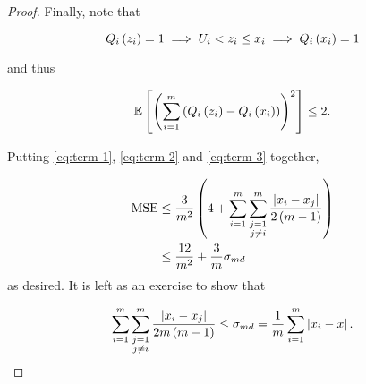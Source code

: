 \documentclass[twoside]{article}
\begin{document}
\begin{proof}
    Finally, note that

    \begin{equation}
        Q_i\left(z_i\right) = 1 \implies U_i < z_i \le x_i \implies Q_i\left(x_i\right) = 1
        \label{eq:ineq-qz-qx}
    \end{equation}

    and thus

    \begin{equation}
        \mathbb{E}\left[ \left(\sum_{i=1}^m\left(Q_i\left(z_i\right)-Q_i\left(x_i\right)\right)\right)^2 \right] \le 2.
        \label{eq:term-3}
    \end{equation}

    Putting \eqref{eq:term-1}, \eqref{eq:term-2} and \eqref{eq:term-3} together,

    \begin{align}
        \mathrm{MSE} &\le \frac{3}{m^2}\left(4 + \sum_{i=1}^m\sum_{\substack{j=1\\j\neq i}}^m\frac{\left\vert x_i-x_j\right\vert}{2\left(m-1\right)}\right) \\
                     &\le \frac{12}{m^2} + \frac{3}{m}\sigma_{md}
                     \label{eq:mse-claim-proof}
    \end{align}
    as desired. It is left as an exercise to show that

    \begin{equation}
        \sum_{i=1}^m\sum_{\substack{j=1\\j\neq i}}^m\frac{\left\vert x_i-x_j\right\vert}{2m\left(m-1\right)} \le \sigma_{md} = \frac{1}{m}\sum_{i=1}^m\left\vert x_i-\bar{x}\right\vert.
        \label{eq:md-ineq}
    \end{equation}
\end{proof}
\end{document}
